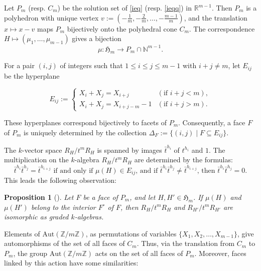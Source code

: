 \documentclass{amsart}
\theoremstyle{plain}
\newtheorem{prop}[theorem]{Proposition}
\theoremstyle{definition}
\numberwithin{theorem}{section}
\numberwithin{equation}{section}
\numberwithin{equation}{theorem}
\begin{document}
Let $P_m$ (resp. $C_m$) be the solution set of \eqref{ieq} (resp. \eqref{ieqq}) in $\mathbb{R}^{m-1}$.
Then $P_m$ is a polyhedron with unique vertex $v:=(-\frac{1}{m},-\frac{2}{m},\dots,-\frac{m-1}{m})$, and the translation $x \mapsto x-v$ maps $P_m$ bijectively onto the polyhedral cone $C_m$.
The correspondence $H \mapsto (\mu_1,\dots,\mu_{m-1})$ gives a bijection
\[
\mu \colon \mathfrak{H}_m \to P_m \cap \mathbb{N}^{m-1}.
\]


For a pair $(i,j)$ of integers such that $1 \le i \le j \le m-1$ with $i+j\not=m$, let $E_{ij}$ be the hyperplane

\begin{equation} \label{eq}
E_{ij}:=\left\{\begin{array}{ll}
X_i+X_j = X_{i+j} & (\text{if }i+j<m),\\
X_i+X_j = X_{i+j-m}-1 & (\text{if }i+j>m).
\end{array}\right.
\end{equation}

These hyperplanes correspond bijectively to facets of $P_m$.
Consequently, a face $F$ of $P_m$ is uniquely determined by the collection $\Delta_F :=\{(i,j) \mid F \subseteq E_{ij}\}$.

The $k$-vector space $R_H/t^mR_H$ is spanned by images $\bar{t}^{h_i}$ of $t^{h_i}$ and $1$.
The multiplication on the $k$-algebra $R_H/t^mR_H$ are determined by the formulas: 
\begin{equation} \label{mult}
\bar{t}^{h_i}\bar{t}^{h_j}=\bar{t}^{h_{i+j}} \text{ if and only if }\mu(H) \in E_{ij} \text{, and } \text{if }\bar{t}^{h_i}\bar{t}^{h_j}\not=\bar{t}^{h_{i+j}} \text{, then }\bar{t}^{h_i}\bar{t}^{h_j}=0.
\end{equation}
This leads the following observation:
\begin{prop}[{\cite[Beispiele 2.4a]{K}}] %
Let $F$ be a face of $P_m$, and let $H, H' \in \mathfrak{H}_m$.
If $\mu(H)$ and $\mu(H')$ belong to the interior $F^{\circ}$ of $F$, then $R_H/t^mR_H$ and $R_{H'}/t^mR_{H'}$ are isomorphic as graded $k$-algebras.
\end{prop}

Elements of $\mathrm{Aut}(\mathbb{Z}/m\mathbb{Z})$, as permutations of variables $\{X_1,X_2,\dots,X_{m-1}\}$, give automorphisms of the set of all faces of $C_m$.
Thus, via the translation from $C_m$ to $P_m$, the group $\mathrm{Aut}(\mathbb{Z}/m\mathbb{Z})$ acts on the set of all faces of $P_m$.
Moreover, faces linked by this action have some similarities:
\end{document}
